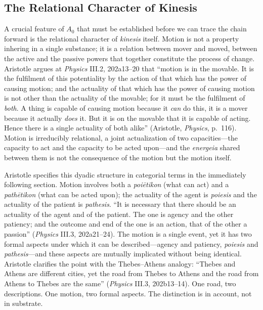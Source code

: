 \subsection*{The Relational Character of Kinesis}

A crucial feature of $A_0$ that must be established before we can trace the chain forward is the relational character of \textit{kinesis} itself. Motion is not a property inhering in a single substance; it is a relation between mover and moved, between the active and the passive powers that together constitute the process of change. Aristotle argues at \textit{Physics} III.2, 202a13--20 that ``motion is in the movable. It is the fulfilment of this potentiality by the action of that which has the power of causing motion; and the actuality of that which has the power of causing motion is not other than the actuality of the movable; for it must be the fulfilment of \textit{both}. A thing is capable of causing motion because it \textit{can} do this, it is a mover because it actually \textit{does} it. But it is on the movable that it is capable of acting. Hence there is a single actuality of both alike'' (Aristotle, \textit{Physics}, p.~116). Motion is irreducibly relational, a joint actualization of two capacities---the capacity to act and the capacity to be acted upon---and the \textit{energeia} shared between them is not the consequence of the motion but the motion itself.

Aristotle specifies this dyadic structure in categorial terms in the immediately following section. Motion involves both a \textit{poiētikon} (what can act) and a \textit{pathētikon} (what can be acted upon); the actuality of the agent is \textit{poiesis} and the actuality of the patient is \textit{pathesis}. ``It is necessary that there should be an actuality of the agent and of the patient. The one is agency and the other patiency; and the outcome and end of the one is an action, that of the other a passion'' (\textit{Physics} III.3, 202a21--24). The motion is a single event, yet it has two formal aspects under which it can be described---agency and patiency, \textit{poiesis} and \textit{pathesis}---and these aspects are mutually implicated without being identical. Aristotle clarifies the point with the Thebes--Athens analogy: ``Thebes and Athens are different cities, yet the road from Thebes to Athens and the road from Athens to Thebes are the same'' (\textit{Physics} III.3, 202b13--14). One road, two descriptions. One motion, two formal aspects. The distinction is in account, not in substrate.

